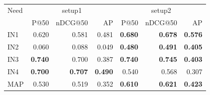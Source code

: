 \begin{tabular}{lrrrrrr}
\toprule
Need & \multicolumn{3}{c}{setup1} & \multicolumn{3}{c}{setup2} \\
 & P@50 & nDCG@50 & AP & P@50 & nDCG@50 & AP \\
\midrule
IN1 & 0.620 & 0.581 & 0.481 & \textbf{0.680} & \textbf{0.678} & \textbf{0.576} \\
IN2 & 0.060 & 0.088 & 0.049 & \textbf{0.480} & \textbf{0.491} & \textbf{0.405} \\
IN3 & \textbf{0.740} & 0.700 & 0.387 & \textbf{0.740} & \textbf{0.745} & \textbf{0.403} \\
IN4 & \textbf{0.700} & \textbf{0.707} & \textbf{0.490} & 0.540 & 0.568 & 0.307 \\
\midrule
MAP & 0.530 & 0.519 & 0.352 & \textbf{0.610} & \textbf{0.621} & \textbf{0.423} \\
\bottomrule
\end{tabular}
